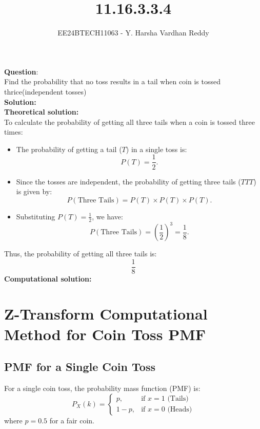 \documentclass[journal]{IEEEtran}
\begin{document}
	
	
	\vspace{3cm}
	
	\title{11.16.3.3.4}
	\author{EE24BTECH11063 - Y. Harsha Vardhan Reddy }
	{\let\newpage\relax\maketitle}
	
	\renewcommand{\thefigure}{\theenumi}
	\renewcommand{\thetable}{\theenumi}
	\setlength{\intextsep}{10pt} %
	
	
	\renewcommand{\thetable}{\theenumi}
	
	
\textbf{Question}:\\
Find the probability that no toss results in a tail when coin is tossed thrice(independent tosses) \\
\textbf{Solution: }\\
\textbf{Theoretical solution: }\\
To calculate the probability of getting all three tails when a coin is tossed three times:

\begin{itemize}
    \item The probability of getting a tail (\(T\)) in a single toss is:
    \[
    P(T) = \frac{1}{2}.
    \]
    \item Since the tosses are independent, the probability of getting three tails (\(TTT\)) is given by:
    \[
    P(\text{Three Tails}) = P(T) \times P(T) \times P(T).
    \]
    \item Substituting \(P(T) = \frac{1}{2}\), we have:
    \[
    P(\text{Three Tails}) = \left(\frac{1}{2}\right)^3 = \frac{1}{8}.
    \]
\end{itemize}

Thus, the probability of getting all three tails is:
\[
\boxed{\frac{1}{8}}
\]
\textbf{Computational solution: }\\


\section*{Z-Transform Computational Method for Coin Toss PMF}
\subsection*{PMF for a Single Coin Toss}
For a single coin toss, the probability mass function (PMF) is:
\[
P_X(k) =
\begin{cases}
p, & \text{if } x = 1 \text{ (Tails)} \\
1-p, & \text{if } x = 0 \text{ (Heads)}
\end{cases}
\]
where \(p = 0.5\) for a fair coin.
\end{document}
